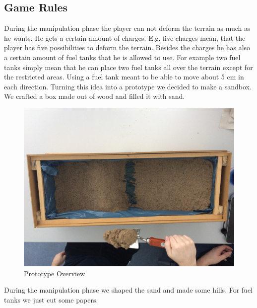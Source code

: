 \documentclass[12pt, letterpaper]{scrartcl}
\begin{document}
	\subsection{Game Rules}
	During the manipulation phase the player can not deform the terrain as much as he wants. He gets a certain amount of charges. E.g. five charges mean, that the player has five possibilities to deform the terrain. 
	Besides the charges he has also a certain amount of fuel tanks that he is allowed to use. For example two fuel tanks simply mean that he can place two fuel tanks all over the terrain except for the restricted areas. Using a fuel tank meant to be able to move about 5 cm in each direction.
	Turning this idea into a prototype we decided to make a sandbox. We crafted a box made out of wood and filled it with sand.
	\begin{figure}[H]
		\centering
		\includegraphics[scale=.2]{images/prototype/prototypeOverview}
		\caption{Prototype Overview}
		\label{prototypeOverview}
	\end{figure}
	During the manipulation phase we shaped the sand and made some hills. For fuel tanks we just cut some papers.
\end{document}
